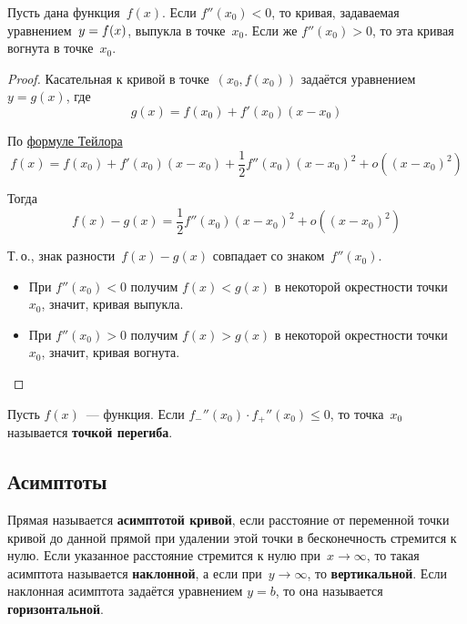 \begin{theorem}
Пусть дана функция~$f(x)$.
Если $f''(x_0) < 0$, то кривая, задаваемая уравнением~$y \opbr= f(x)$, выпукла в точке~$x_0$.
Если же $f''(x_0) > 0$, то эта кривая вогнута в точке~$x_0$.
\end{theorem}
\begin{proof}
Касательная к кривой в точке~$(x_0, f(x_0))$ задаётся уравнением~$y = g(x)$, где
\begin{equation*}
g(x) = f(x_0) + f'(x_0)(x - x_0)
\end{equation*}

По \hyperref[eq:Taylor_series]{формуле Тейлора}
\begin{equation*}
f(x) = f(x_0) + f'(x_0)(x - x_0) + \frac12 f''(x_0)(x - x_0)^2 + o((x - x_0)^2)
\end{equation*}

Тогда
\begin{equation*}
f(x) - g(x) = \frac12 f''(x_0)(x - x_0)^2 + o((x - x_0)^2)
\end{equation*}

Т.\,о., знак разности~$f(x) - g(x)$ совпадает со знаком~$f''(x_0)$.
\begin{itemize}
	\item При $f''(x_0) < 0$ получим $f(x) < g(x)$ в некоторой окрестности точки~$x_0$, значит, кривая выпукла.
	\item При $f''(x_0) > 0$ получим $f(x) > g(x)$ в некоторой окрестности точки~$x_0$, значит, кривая вогнута.
\end{itemize}
\end{proof}

Пусть $f(x)$~--- функция.
 Если $f_-''(x_0) \cdot f_+''(x_0) \leqslant 0$, то точка~$x_0$ называется \textbf{точкой перегиба}.

\subsection{Асимптоты}
 Прямая называется \textbf{асимптотой кривой}, если расстояние от переменной точки кривой до данной прямой при удалении этой точки в бесконечность стремится к нулю.
Если указанное расстояние стремится к нулю при~$x \to \infty$, то такая асимптота называется \textbf{наклонной}, а если при~$y \to \infty$, то \textbf{вертикальной}.
Если наклонная асимптота задаётся уравнением $y = b$, то она называется \textbf{горизонтальной}.

